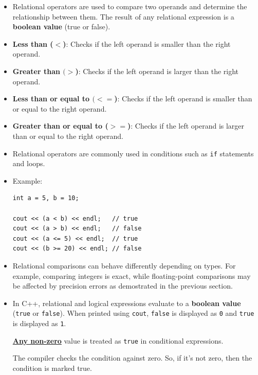 \documentclass[10pt]{article}
\begin{document}
\begin{itemize}
	\item Relational operators are used to compare two operands and determine the relationship between them. The result of any relational expression is a \textbf{boolean value} (true or false).

	\item \textbf{Less than ($<$)}: Checks if the left operand is smaller than the right operand.

	\item \textbf{Greater than $(>$)}: Checks if the left operand is larger than the right operand.

	\item \textbf{Less than or equal to $(<=$)}: Checks if the left operand is smaller than or equal to the right operand.

	\item \textbf{Greater than or equal to ($>=$)}: Checks if the left operand is larger than or equal to the right operand.

	\item Relational operators are commonly used in conditions such as \verb|if| statements and loops.

	\item Example:
	\begin{verbatim}
int a = 5, b = 10;

cout << (a < b) << endl;   // true
cout << (a > b) << endl;   // false
cout << (a <= 5) << endl;  // true
cout << (b >= 20) << endl; // false
	\end{verbatim}

	\item Relational comparisons can behave differently depending on types. For example, comparing integers is exact, while floating-point comparisons may be affected by precision errors as demostrated in the previous section.

\item In C++, relational and logical expressions evaluate to a \textbf{boolean value} (\verb|true| or \verb|false|). When printed using \verb|cout|, \verb|false| is displayed as \verb|0| and \verb|true| is displayed as \verb|1|. 

	\textbf{\underline{Any non-zero}} value is treated as \verb|true| in conditional expressions.

	The compiler checks the condition against zero. So, if it's not zero, then the condition is marked true.

\end{itemize}
\end{document}
